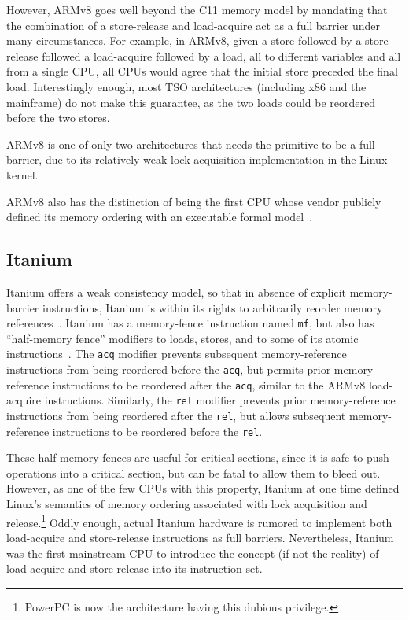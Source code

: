 However, ARMv8 goes well beyond the C11 memory model by mandating that
the combination of a store-release and load-acquire act as a full
barrier under many circumstances.
For example, in ARMv8, given a store followed by a store-release followed
a load-acquire followed by a load, all to different variables and all from
a single CPU, all CPUs
would agree that the initial store preceded the final load.
Interestingly enough, most TSO architectures (including x86 and the
mainframe) do not make this guarantee, as the two loads could be
reordered before the two stores.

ARMv8 is one of only two architectures that needs the
 primitive to be a full barrier,
due to its relatively weak lock-acquisition implementation in
the Linux kernel.

ARMv8 also has the distinction of being the first CPU whose vendor publicly
defined its memory ordering with an executable formal model~\cite{ARMv8A:2017}.

\subsection{Itanium}
\label{sec:memorder:Itanium}

Itanium offers a weak consistency model, so that in absence of explicit
memory-barrier instructions, Itanium is within its rights to arbitrarily
reorder memory references~\cite{IntelItanium02v2}.
Itanium has a memory-fence instruction named {\tt mf}, but also has
``half-memory fence'' modifiers to loads, stores, and to some of its atomic
instructions~\cite{IntelItanium02v3}.
The {\tt acq} modifier prevents subsequent memory-reference instructions
from being reordered before the {\tt acq}, but permits
prior memory-reference instructions to be reordered after the {\tt acq},
similar to the ARMv8 load-acquire instructions.
Similarly, the {\tt rel} modifier prevents prior memory-reference
instructions from being reordered after the {\tt rel}, but allows
subsequent memory-reference instructions to be reordered before
the {\tt rel}.

These half-memory fences are useful for critical sections, since
it is safe to push operations into a critical section, but can be
fatal to allow them to bleed out.
However, as one of the few CPUs with this property, Itanium at one
time defined Linux's semantics of memory ordering associated with lock
acquisition and release.\footnote{
	PowerPC is now the architecture having this dubious privilege.}
Oddly enough, actual Itanium hardware is rumored to implement
both load-acquire and store-release instructions as full barriers.
Nevertheless, Itanium was the first mainstream CPU to introduce the concept
(if not the reality) of load-acquire and store-release into its
instruction set.

